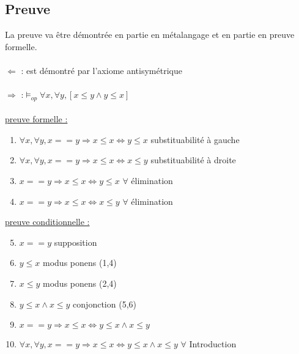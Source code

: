 \subsection{Preuve}
La preuve va être démontrée en partie en métalangage et en partie en preuve formelle.\\ \\
$\Leftarrow $ : est démontré par l'axiome antisymétrique\\ \\
$\Rightarrow$ :$\models_{op} \forall x, \forall y, [x\leq y \land y \leq x]$ \\ \\
\underline{preuve formelle :}
\begin{enumerate}
\item $ \forall x, \forall y, x==y \Rightarrow x \leq x \Leftrightarrow y \leq x$ \hfill substituabilité à gauche
\item $ \forall x, \forall y, x==y \Rightarrow x \leq x \Leftrightarrow x \leq y$ \hfill substituabilité à droite
\item $ x==y \Rightarrow x \leq x \Leftrightarrow y \leq x $ \hfill $\forall$ élimination
\item $ x==y \Rightarrow x \leq x \Leftrightarrow x \leq y $ \hfill $\forall$ élimination
\end{enumerate}
\underline{preuve conditionnelle :}
\begin{enumerate}
\setcounter{enumi}{4}
\item $ x==y$ \hfill supposition
\item $ y\leq x$ \hfill modus ponens (1,4)
\item $ x\leq y$ \hfill modus ponens (2,4)
\item $ y\leq x \land  x\leq y$ \hfill conjonction (5,6)
\item $ x==y \Rightarrow x \leq x \Leftrightarrow y\leq x \land  x\leq y$
\item $ \forall x, \forall y, x==y \Rightarrow x \leq x \Leftrightarrow y\leq x \land  x\leq y$ \hfill $\forall$ Introduction
\end{enumerate}
